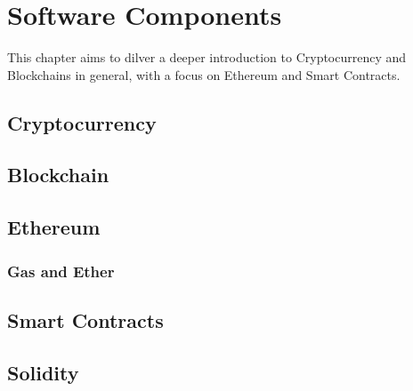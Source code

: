 \chapter{Software Components}\label{chap:software}
\chapterstart

This chapter aims to dilver a deeper introduction to Cryptocurrency and Blockchains in general, with a focus on Ethereum and Smart Contracts.


\section{Cryptocurrency}\label{sec:crypto}


\section{Blockchain}\label{sec:blockchain}


\section{Ethereum}\label{sec:ethereum}


\subsection{Gas and Ether}\label{sec:gasether}


\section{Smart Contracts}\label{sec:sc}

\section{Solidity}\label{sec:sol}




\chapterend

